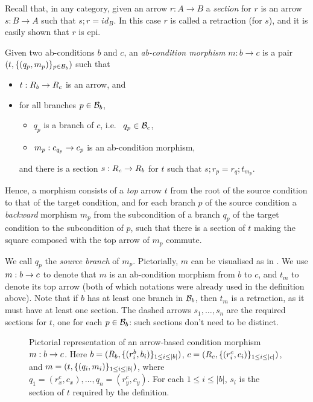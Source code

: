 Recall that, in any category, given an arrow $r: A \to B$ a \emph{section} for $r$ is an arrow $s: B \to A$ such that $s;r = id_B$. In this case $r$ is called a retraction (for $s$), and it is easily shown that $r$ is epi.

\begin{definition}
  Given two ab-conditions $b$ and $c$, an \emph{ab-condition morphism} $m: b \to c$
  is a pair $(t,\{{(q_p,m_p)}\}_{p\in \mathcal{B}_b})$ such that   
  \begin{itemize}
    \item $t:R_b\rightarrow R_c$ is an arrow, and  
  \item  for all branches $p\in \mathcal{B}_b$, 
  \begin{itemize}
    \item $q_p$ is a branch of $c$, i.e.~ $q_p \in \mathcal{B}_c$,
    \item $m_p:c_{q_p}\rightarrow c_p$ is an ab-condition morphism,
  \end{itemize}
    
    and there is a section $s:R_c\rightarrow R_b$ for $t$ such that $s; r_p = r_q;t_{m_p}$.
  
\end{itemize}
\end{definition}
%
Hence, a morphism consists of a \emph{top} arrow $t$ from the root of the source condition to that of the target condition, and for each branch $p$ of the source condition a \emph{backward} morphism $m_p$ from the subcondition of a branch $q_p$ of the target condition to the subcondition of $p$, such that there is a section of $t$ making the square composed with the top arrow of $m_p$ commute. 

We call $q_p$ the \emph{source branch} of $m_p$. Pictorially, $m$ can be visualised as in . We use $m:b\rightarrow c$ to denote that $m$ is an ab-condition morphism from $b$ to $c$, and $t_m$ to denote its top arrow (both of which notations were already used in the definition above). Note that if $b$ has at least one branch in $\mathcal{B}_b$, then $t_m$ is a retraction, as it must have at least one section.  The dashed arrows $s_1, \ldots, s_n$ are the required sections for $t$, one for each $p\in \mathcal{B}_b$: such sections don't need to be distinct.  

%
\begin{figure}
  \centering
  
  \caption{Pictorial representation of an arrow-based condition morphism $m:b\rightarrow c$. Here $b=(R_b, \{{(r^b_i,b_i)}\}_{1\leq i\leq |b|})$, $c=(R_c, \{{(r^c_i,c_i)}\}_{1\leq i\leq |c|})$, and     
  $m = (t,\{{(q_i,m_i)}\}_{1\leq i \leq |b|})$, where $q_1 = (r^c_x,c_x), \ldots,q_n = (r^c_y,c_y)$. For each $1 \leq i \leq |b|$, $s_i$ is the section of $t$ required by the definition.}
\end{figure}

